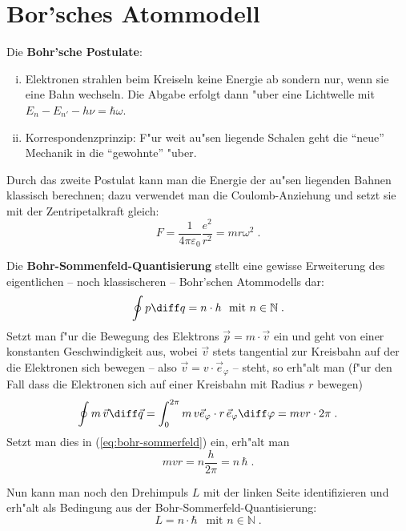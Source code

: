 \documentclass[a4paper,draft]{article}
\begin{document}
\section{Bor'sches Atommodell}
\label{sec:borsches_atommodell}



  Die \textbf{Bohr'sche Postulate}:
  \begin{enumerate}[(i)]
  \item Elektronen strahlen beim Kreiseln keine Energie ab sondern
    nur, wenn sie eine Bahn wechseln.
    Die Abgabe erfolgt dann "uber eine Lichtwelle mit $E_n - E_{n'} -
    h \nu = \hbar \omega$.
  \item Korrespondenzprinzip: F"ur weit au"sen liegende Schalen geht
    die "`neue"' Mechanik in die "`gewohnte"' "uber.
  \end{enumerate}


Durch das zweite Postulat kann man die Energie der au"sen liegenden
Bahnen klassisch berechnen; dazu verwendet man die Coulomb-Anziehung
und setzt sie mit der Zentripetalkraft gleich:
\begin{equation}
  \label{eq:1}
  F = \frac{1}{4\pi\varepsilon_0} \frac{e^2}{r^2} = mr \omega^2 \;.
\end{equation}


Die \textbf{Bohr-Sommenfeld-Quantisierung} stellt eine gewisse
Erweiterung des eigentlichen -- noch klassischeren -- Bohr'schen
Atommodells dar:
\begin{equation}
  \label{eq:bohr-sommerfeld}
  \oint p \diff q = n \cdot h  ~ \text{ mit } n \in \mathbb N\;.
\end{equation}
Setzt man f"ur die Bewegung des Elektrons $\vec p = m \cdot \vec v$
ein und geht von einer konstanten Geschwindigkeit aus, wobei $\vec v$
stets tangential zur Kreisbahn auf der die Elektronen sich bewegen --
also $\vec v = v \cdot \vec e_\varphi$ -- steht, so erh"alt man (f"ur
den Fall dass die Elektronen sich auf einer Kreisbahn mit Radius $r$ bewegen)
\begin{equation*}
  \oint m \, \vec v \diff \vec q = \int_{0}^{2 \pi} m \, v \vec
  e_\varphi \cdot r \, \vec e_\varphi \diff \varphi 
=
m v r \cdot 2 \pi \;.
\end{equation*}
Setzt man dies in (\ref{eq:bohr-sommerfeld}) ein, erh"alt man
\begin{equation*}
  mvr = n \frac{h}{2\pi} = n \, \hbar \;.
\end{equation*}

Nun kann man noch den Drehimpuls $L$ mit der linken Seite
identifizieren und erh"alt als Bedingung aus der
Bohr-Sommerfeld-Quantisierung:
\begin{equation}
\label{eq:2}
  { L = n \cdot \hbar } ~ ~  \text{ mit } n \in \mathbb N \;.
\end{equation}
\end{document}
